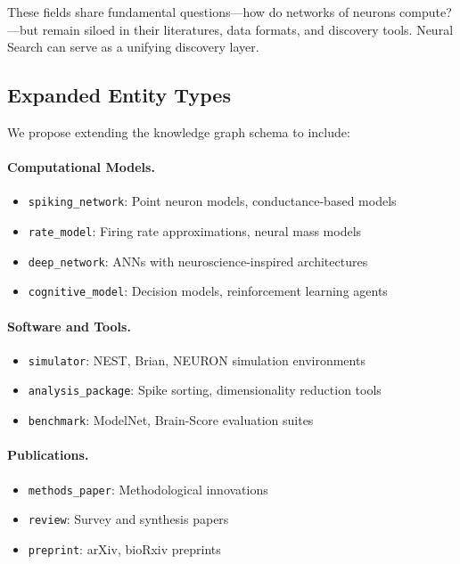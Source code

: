 \documentclass{article}
\theoremstyle{definition}
\begin{document}
These fields share fundamental questions---how do networks of neurons compute?---but remain siloed in their literatures, data formats, and discovery tools. Neural Search can serve as a unifying discovery layer.

\subsection{Expanded Entity Types}

We propose extending the knowledge graph schema to include:

\paragraph{Computational Models.}
\begin{itemize}
    \item \texttt{spiking\_network}: Point neuron models, conductance-based models
    \item \texttt{rate\_model}: Firing rate approximations, neural mass models
    \item \texttt{deep\_network}: ANNs with neuroscience-inspired architectures
    \item \texttt{cognitive\_model}: Decision models, reinforcement learning agents
\end{itemize}

\paragraph{Software and Tools.}
\begin{itemize}
    \item \texttt{simulator}: NEST, Brian, NEURON simulation environments
    \item \texttt{analysis\_package}: Spike sorting, dimensionality reduction tools
    \item \texttt{benchmark}: ModelNet, Brain-Score evaluation suites
\end{itemize}

\paragraph{Publications.}
\begin{itemize}
    \item \texttt{methods\_paper}: Methodological innovations
    \item \texttt{review}: Survey and synthesis papers
    \item \texttt{preprint}: arXiv, bioRxiv preprints
\end{itemize}
\end{document}
